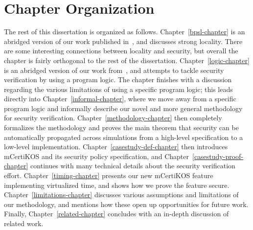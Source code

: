 \section{Chapter Organization}
The rest of this dissertation is organized as follows. 
Chapter~\ref{bpsl-chapter} is an abridged version of our work
published in~\cite{costanzo-bpsl}, and discusses strong locality.
There are some interesting connections between locality and security, 
but overall the chapter is fairly orthogonal to the rest of the dissertation. 
Chapter~\ref{logic-chapter} is an abridged version of our work
from~\cite{costanzo-ddifc}, and attempts to tackle security verification
by using a program logic. The chapter finishes with a discussion
regarding the various limitations of using a specific program logic;
this leads directly into Chapter~\ref{informal-chapter}, where we
move away from a specific program logic and
informally describe our novel and more general methodology for security verification.
Chapter~\ref{methodology-chapter} then completely formalizes
the methodology and proves the main theorem that security can
be automatically propagated across simulations from a high-level
specification to a low-level implementation. 
Chapter~\ref{casestudy-def-chapter} then introduces mCertiKOS
and its security policy specification, and Chapter~\ref{casestudy-proof-chapter}
continues with many technical details about the security verification 
effort. Chapter~\ref{timing-chapter} presents our new mCertiKOS
feature implementing virtualized time, and shows how we prove the
feature secure. Chapter~\ref{limitations-chapter} discusses various
assumptions and limitations of our methodology, and mentions how
these open up opportunities for future work. Finally, 
Chapter~\ref{related-chapter} concludes with an in-depth discussion 
of related work.

